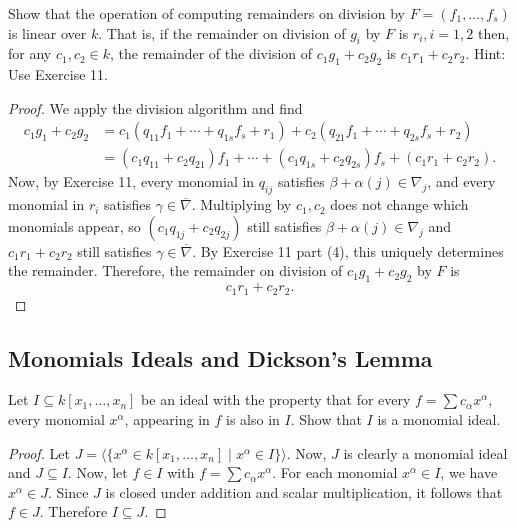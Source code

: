 \begin{tcolorbox}[title=Problem 12, breakable]
    Show that the operation of computing remainders on division by $F = (f_1, \ldots, f_s)$
    is linear over $k$. That is, if the remainder on division 
    of $g_i$ by $F$ is $r_i, i = 1, 2$ then, for any 
    $c_1, c_2 \in k$, the remainder of the division of $c_1 g_1
    + c_2 g_2$ is $c_1 r_1  + c_2 r_2$. Hint: Use Exercise 11.
\end{tcolorbox}

\begin{proof}
    We apply the division algorithm and find
    \begin{align*}
        c_1 g_1 + c_2 g_2 
        &= c_1(q_{11} f_1 + \cdots + q_{1s} f_s + r_1)
         + c_2(q_{21} f_1 + \cdots + q_{2s} f_s + r_2) \\
        &= (c_1 q_{11} + c_2 q_{21}) f_1 + \cdots + (c_1 q_{1s} + c_2 q_{2s}) f_s
         + (c_1 r_1 + c_2 r_2).
    \end{align*}
    Now, by Exercise 11, every monomial in $q_{ij}$ satisfies 
    $\beta + \alpha(j) \in \nabla_j$, and every monomial in $r_i$ satisfies 
    $\gamma \in \overline{\nabla}$. Multiplying by $c_1, c_2$ does not change which 
    monomials appear, so $(c_1 q_{1j} + c_2 q_{2j})$ still satisfies 
    $\beta + \alpha(j) \in \nabla_j$ and $c_1 r_1 + c_2 r_2$ still satisfies 
    $\gamma \in \overline{\nabla}$.
    By Exercise 11 part (4), this uniquely determines the remainder. 
    Therefore, the remainder on division of $c_1 g_1 + c_2 g_2$ by $F$ is
    \[
        c_1 r_1 + c_2 r_2.
    \]
\end{proof}

\subsection{Monomials Ideals and Dickson's Lemma}

\begin{tcolorbox}[title=Problem 1, breakable]
    Let $I \subseteq k[x_1, \ldots, x_n]$ be an ideal with the property 
    that for every $f = \sum c_\alpha x^\alpha$, every monomial $x^\alpha$,
    appearing in $f$ is also in $I$. Show that $I$ is a monomial ideal.
\end{tcolorbox}


\begin{proof}
    Let $J = \langle \{x^\alpha \in k[x_1, \ldots, x_n] \mid x^\alpha \in I\} \rangle$.
    Now, $J$ is clearly a monomial ideal and $J \subseteq I$.
    Now, let $f \in I$ with $f = \sum c_\alpha x^\alpha$.
    For each monomial $x^\alpha \in I$, we have $x^\alpha \in J$.
    Since $J$ is closed under addition and scalar multiplication, it follows that $f \in J$.
    Therefore $I \subseteq J$.
\end{proof}

